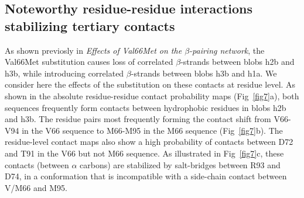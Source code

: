 \documentclass[10pt,letterpaper]{article}
\begin{document}
\subsection*{Noteworthy residue-residue interactions stabilizing tertiary contacts}
\label{sec:residuelevel}

As shown previosly in {\it Effects of Val66Met on the $\beta$-pairing network}, the Val66Met substitution causes loss of correlated $\beta$-strands between blobs h2b and h3b, while introducing correlated $\beta$-strands between blobs h3b and h1a. We consider here the effects of the substitution on these contacts at residue level. As shown in the absolute residue-residue contact probability maps (Fig~\ref{fig7}a), both sequences frequently form contacts between hydrophobic residues in blobs h2b and h3b. The residue pairs most frequently forming the contact shift from V66-V94 in the V66 sequence to M66-M95 in the M66 sequence (Fig~\ref{fig7}b). 
The residue-level contact maps also show a high probability of contacts between D72 and T91 in the V66 but not M66 sequence. As illustrated in Fig~\ref{fig7}c, these contacts (between $\alpha$ carbons) are stabilized by salt-bridges between R93 and D74, in a conformation that is incompatible with a side-chain contact between V/M66 and M95. 
\end{document}
